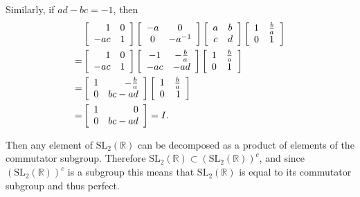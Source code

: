 \documentclass{article}
\begin{document}
\begin{Answer}
\begin{enumerate}[(a)]
{      Similarly, if $ad - bc = -1$, then 
      \begin{align*}
       &\left[\begin{array}{r r}
          1   & 0 \\
          -ac & 1
        \end{array}\right]
        \left[\begin{array}{c c}
          -a & 0     \\
           0 & -a^{-1}
        \end{array}\right]
        \left[\begin{array}{c c}
          a & b \\ c & d
        \end{array}\right]        
        \left[\begin{array}{c c}
          1 & \frac{b}{a} \\
          0 & 1
        \end{array}\right] \\
      =&
        \left[\begin{array}{r r}
          1   & 0 \\
          -ac & 1
        \end{array}\right]
        \left[\begin{array}{c c}
          -1 & -\frac{b}{a} \\ -ac & -ad
        \end{array}\right]
        \left[\begin{array}{c c}
          1 & \frac{b}{a} \\
          0 & 1
        \end{array}\right] \\
      =&
        \left[\begin{array}{r r}
          1 & -\frac{b}{a} \\ 0 & bc - ad
        \end{array}\right]
        \left[\begin{array}{r r}
          1 & \frac{b}{a} \\ 0 & 1
        \end{array}\right] \\
      =&
        \left[\begin{array}{r r}
          1 & 0 \\ 0 & bc - ad
        \end{array}\right] = I.
      \end{align*}
        
      Then any element of 
      $\mathrm{SL}_2(\mathbb{R})$ can be decomposed as a product of
      elements of the commutator subgroup. Therefore 
      $\mathrm{SL}_2(\mathbb{R}) \subset (\mathrm{SL}_2(\mathbb{R}))^c$,
      and since $(\mathrm{SL}_2(\mathbb{R}))^c$ is a subgroup this
      means that $\mathrm{SL}_2(\mathbb{R})$ is equal to its
      commutator subgroup and thus perfect.
      }
\end{enumerate}

\end{Answer}
\end{document}
